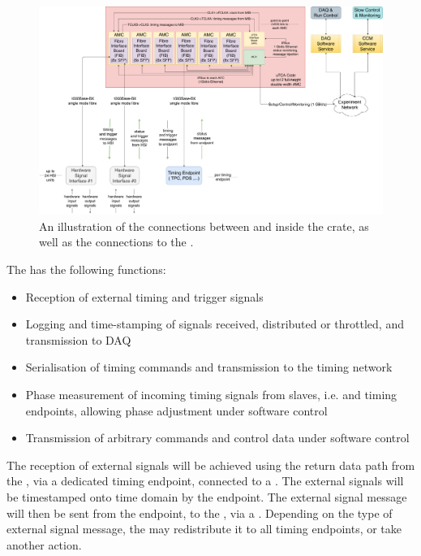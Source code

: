 \documentclass{dune}
\begin{document}
\begin{figure}[h]
\includegraphics[width=\textwidth]{DUNE_SP_Timing_ETL_interface_1apr20.pdf}
\caption{An illustration of the connections between  and  inside the  crate, as well as the connections to the .}
\label{fig:mib_utca_connections}
\end{figure}
The  has the following functions:

\begin{itemize}
	\item Reception of external timing and trigger signals
	\item Logging and time-stamping of signals received, distributed or throttled, and transmission to DAQ
	\item Serialisation of timing commands and transmission to the timing network
	\item Phase measurement of incoming timing signals from slaves, i.e.  and timing endpoints, allowing phase adjustment under software control
	\item Transmission of arbitrary commands and control data under software control
\end{itemize}

The reception of external signals will be achieved using the return data path from the , via a dedicated timing endpoint, connected to a  . The external signals will be timestamped onto  time domain by the  endpoint. The external signal  message will then be sent from the endpoint, to the , via a . Depending on the type of external signal message, the  may redistribute it to all timing endpoints, or take another action. 
\end{document}
